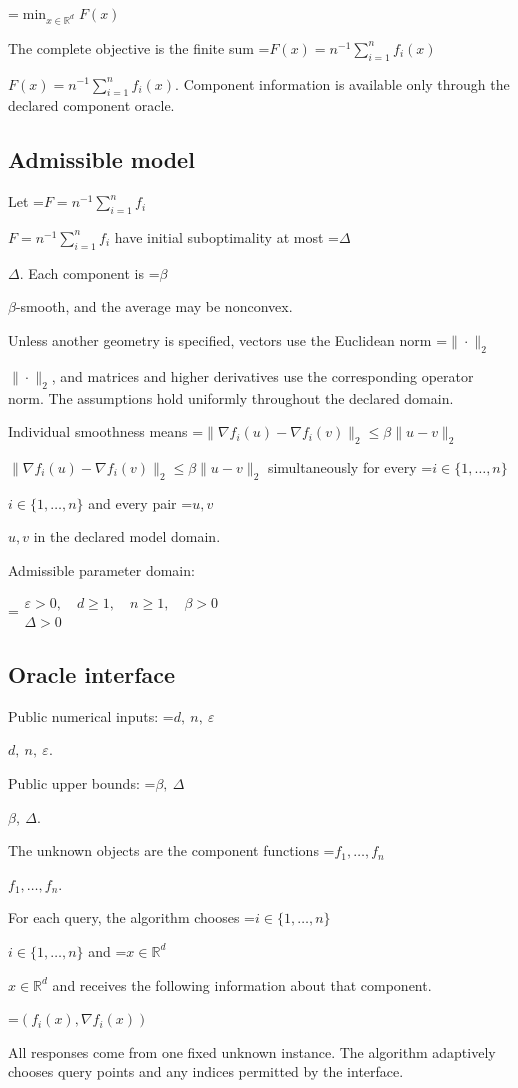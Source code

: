\documentclass[10pt,a4paper]{article}
\newcommand{\AtlasMath}[1]{\par\begingroup\centering\setbox0=\hbox{$\displaystyle #1$}\ifdim\wd0>1.4\linewidth\typeout{ATLAS WIDE FORMULA: \the\wd0}\fi\ifdim\wd0>\linewidth\resizebox{\linewidth}{!}{\box0}\else\box0\fi\par\endgroup}
\newcommand{\AtlasInlineMath}[1]{\begingroup\setbox0=\hbox{$#1$}\ifdim\wd0>.4\linewidth\endgroup\AtlasMath{#1}\else\endgroup$#1$\fi}
\begin{document}
\AtlasMath{\min_{x\in \mathbb{R}^d}F(x)}


The complete objective is the finite sum \AtlasInlineMath{F(x)=n^{-1}\sum_{i=1}^n f_i(x)}. Component information is available only through the declared component oracle.

\subsection{Admissible model}
Let \AtlasInlineMath{F=n^{-1}\sum_{i=1}^n f_i} have initial suboptimality at most \AtlasInlineMath{\Delta}. Each component is \AtlasInlineMath{\beta}-smooth, and the average may be nonconvex.

Unless another geometry is specified, vectors use the Euclidean norm \AtlasInlineMath{\|\cdot\|_2}, and matrices and higher derivatives use the corresponding operator norm. The assumptions hold uniformly throughout the declared domain.

Individual smoothness means \AtlasInlineMath{\|\nabla f_i(u)-\nabla f_i(v)\|_2\le\beta\|u-v\|_2} simultaneously for every \AtlasInlineMath{i\in\{1,\ldots,n\}} and every pair \AtlasInlineMath{u,v} in the declared model domain.

Admissible parameter domain:


\AtlasMath{\begin{gathered}\varepsilon > 0,\quad d \ge 1,\quad n \ge 1,\quad \beta > 0\\\Delta > 0\end{gathered}}


\subsection{Oracle interface}
Public numerical inputs: \AtlasInlineMath{d,\ n,\ \varepsilon}.

Public upper bounds: \AtlasInlineMath{\beta,\ \Delta}.

The unknown objects are the component functions \AtlasInlineMath{f_1,\ldots,f_n}.

For each query, the algorithm chooses \AtlasInlineMath{i\in\{1,\ldots,n\}} and \AtlasInlineMath{x\in\mathbb R^d} and receives the following information about that component.


\AtlasMath{(f_i(x),\nabla f_i(x))}


All responses come from one fixed unknown instance. The algorithm adaptively chooses query points and any indices permitted by the interface.
\end{document}
